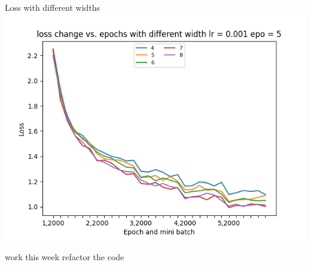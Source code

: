 \begin{frame}{Loss with different widths}
    \includegraphics[scale=.6]{images/loss change vs. epochs with different width lr 0.001 epo 5.png}
\end{frame}

\begin{frame}{work this week}
    refactor the code
\end{frame}



